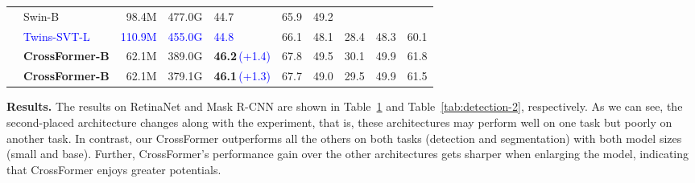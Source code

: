 \documentclass{article} \usepackage{iclr2022_conference,times}
\begin{document}
\begin{table}[]
{{\begin{tabular}{c|l|rr|lll|lll}
                & Swin-B & 98.4M & 477.0G & 44.7 & 65.9 & 49.2 &  &  &  \\
                & \textcolor{blue}{Twins-SVT-L} & \textcolor{blue}{110.9M} & \textcolor{blue}{455.0G} & \textcolor{blue}{44.8} & 66.1 & 48.1 & 28.4 & 48.3 & 60.1 \\
                & \textbf{CrossFormer-B} & 62.1M & 389.0G & \textbf{46.2}\,\textcolor{blue}{(+1.4)} & 67.8 & 49.5 & 30.1 & 49.9 & 61.8 \\
                & \textbf{CrossFormer-B} & 62.1M & 379.1G & \textbf{46.1}\,\textcolor{blue}{(+1.3)} & 67.7 & 49.0 & 29.5 & 49.9 & 61.5 \\
                \bottomrule
    \end{tabular}}}
    \label{tab:detection}
        \vspace{-6mm}
\end{table}

\textbf{Results.} The results on RetinaNet and Mask R-CNN are shown in Table~\ref{tab:detection} and Table~\ref{tab:detection-2}, respectively. As we can see, the second-placed architecture changes along with the experiment, that is, these architectures may perform well on one task but poorly on another task. In contrast, our CrossFormer outperforms all the others on both tasks (detection and segmentation) with both model sizes (small and base). Further, CrossFormer's performance gain over the other architectures gets sharper when enlarging the model, indicating that CrossFormer enjoys greater potentials.
\end{document}
